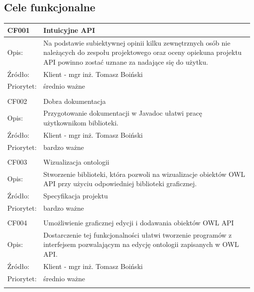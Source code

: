 \documentclass[a4paper,10pt]{article}
\begin{document}
\subsection{Cele funkcjonalne}


\begin{center}

\begin{tabular}{|m{3cm}|m{9cm}|} \hline

CF001 & Intuicyjne API \\ \hline
Opis: & Na podstawie subiektywnej opinii kilku zewnętrznych osób nie należących do zespołu projektowego oraz oceny opiekuna projektu API powinno zostać uznane za nadające się do użytku. \\ \hline
Źródło: & Klient - mgr inż. Tomasz Boiński \\ \hline
Priorytet: & średnio ważne  \\ \hline
\multicolumn{2}{c}{} \\

 \hline
CF002 & Dobra dokumentacja \\ \hline
Opis: & Przygotowanie dokumentacji w Javadoc ułatwi pracę użytkownikom biblioteki. \\ \hline
Źródło: & Klient - mgr inż. Tomasz Boiński  \\ \hline
Priorytet: & bardzo ważne \\ \hline

\multicolumn{2}{c}{} \\
 \hline
CF003 & Wizualizacja ontologii \\ \hline
Opis: & Stworzenie biblioteki, która pozwoli na wizualizacje obiektów OWL API przy użyciu odpowiedniej biblioteki graficznej. \\ \hline
Źródło:  & Specyfikacja projektu  \\ \hline
Priorytet: & bardzo ważne \\ \hline

\multicolumn{2}{c}{} \\
 \hline
CF004 & Umożliwienie graficznej edycji i dodawania obiektów OWL API \\ \hline
Opis: &  Dostarczenie tej funkcjonalności ułatwi tworzenie programów z interfejsem pozwalającym na edycję ontologii zapisanych w OWL API. \\ \hline
Źródło: & Klient - mgr inż. Tomasz Boiński \\ \hline
Priorytet: & średnio ważne \\ \hline
\multicolumn{2}{c}{} \\



\end{tabular}
\end{center}
\end{document}
